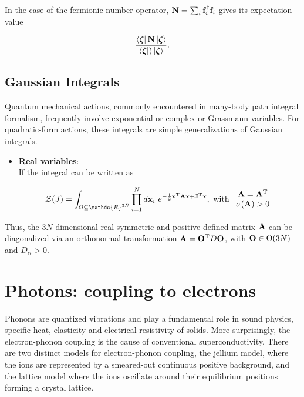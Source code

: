 \documentclass{homework}
\begin{document}
In the case of the fermionic number operator, ${{\bf N}} = \sum_{i} {{\bf f}}_i^\dagger {{\bf f}}_i$ gives its expectation value 

$$
\frac{\bra{\bm{\zeta}} {{\bf N}} \ket{\bm{\zeta}}}{\bra{\bm{\zeta}}) \ket{\bm{\zeta}}}. 
$$

\clearpage

\subsection{Gaussian Integrals}
 
Quantum mechanical actions, commonly encountered in many-body path integral formalism, frequently involve exponential or complex or Grassmann variables. For quadratic-form actions, these integrals are simple generalizations of Gaussian integrals. 

\begin{itemize}
    \item \textbf{Real variables}: \\
    
    If the integral can be written as 
    
    \begin{equation}
        \mathcal{Z}(J) = \int_{\Omega \subseteq \mathds{R}^{3N}} \prod_{i=1}^{N} d{{\bf x}}_i \blanky e^{-\frac{1}{2} {{\bf x}}^{\textnormal{T}} {{\bf A}} {{\bf x}} + {{\bf J}}^{\textnormal{T}} {{\bf x}}}, \textnormal{ with } \begin{array}{c}
            {{\bf A}} = {{\bf A}}^{\textnormal{T}} \\
            \sigma({{\bf A}}) > 0 
        \end{array}
    \end{equation}
\end{itemize}

Thus, the $3N$-dimensional real symmetric and positive defined matrix ${{{\bf A}}}$ can be diagonalized via an orthonormal transformation ${{\bf A}} = {{\bf O}}^{\textnormal{T}} D  {{\bf O}}$, with $ {{\bf O}} \in \textnormal{O}(3N)$ and $D_{ii} > 0$. 

\clearpage

\section{Photons: coupling to electrons}

Phonons are quantized vibrations and play a fundamental role in sound physics, specific heat, elasticity and electrical resistivity of solids. More surprisingly, the electron-phonon coupling is the cause of conventional superconductivity. There are two distinct models for electron-phonon coupling, the jellium model, where the ions are represented by a smeared-out continuous positive background, and the lattice model where the ions oscillate around their equilibrium positions forming a crystal lattice. \\
\end{document}
